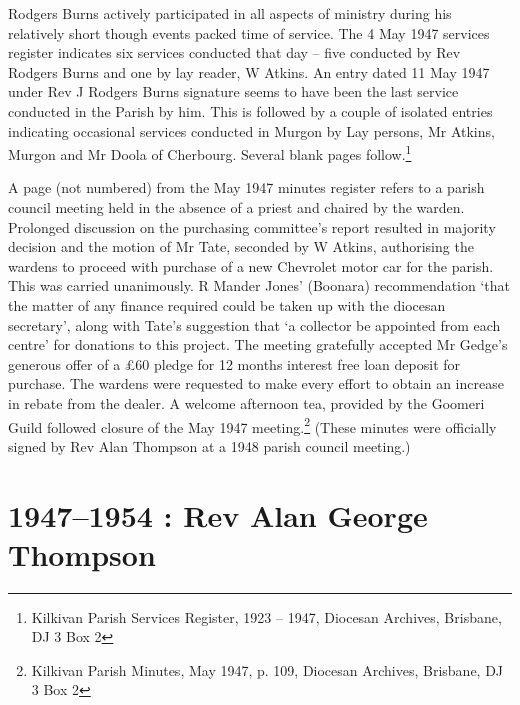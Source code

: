 Rodgers Burns actively participated in all aspects of ministry during
his relatively short though events packed time of service. The 4 May
1947 services register indicates six services conducted that day -- five
conducted by Rev Rodgers Burns and one by lay reader, W Atkins. An entry
dated 11 May 1947 under Rev J Rodgers Burns signature seems to have been
the last service conducted in the Parish by him. This is followed by a
couple of isolated entries indicating occasional services conducted in
Murgon by Lay persons, Mr Atkins, Murgon and Mr Doola of Cherbourg.
Several blank pages follow.\footnote{Kilkivan Parish Services Register,
  1923 -- 1947, Diocesan Archives, Brisbane, DJ 3 Box 2}

A page (not numbered) from the May 1947 minutes register refers to a
parish council meeting held in the absence of a priest and chaired by
the warden. Prolonged discussion on the purchasing committee's report
resulted in majority decision and the motion of Mr Tate, seconded by W
Atkins, authorising the wardens to proceed with purchase of a new
Chevrolet motor car for the parish. This was carried unanimously. R
Mander Jones' (Boonara) recommendation `that the matter of any finance
required could be taken up with the diocesan secretary', along with
Tate's suggestion that `a collector be appointed from each centre' for
donations to this project. The meeting gratefully accepted Mr Gedge's
generous offer of a \pounds60 pledge for 12 months interest free loan deposit
for purchase. The wardens were requested to make every effort to obtain
an increase in rebate from the dealer. A welcome afternoon tea, provided
by the Goomeri Guild followed closure of the May 1947
meeting.\footnote{Kilkivan Parish Minutes, May 1947, p. 109, Diocesan
  Archives, Brisbane, DJ 3 Box 2} (These minutes were officially signed
by Rev Alan Thompson at a 1948 parish council meeting.)

\printendnotes
\setcounter{endnote}{0}
\chapter{1947--1954 : Rev Alan George
Thompson}

